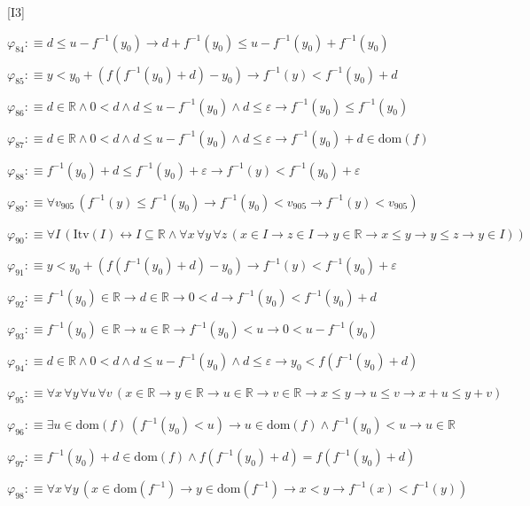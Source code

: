 \begin{fullproof}{[I3]}
\begin{abbrevlist}
\item $\varphi_{84} :\equiv d \leq u - f^{-1}(y_{0}) \to d + f^{-1}(y_{0}) \leq u - f^{-1}(y_{0}) + f^{-1}(y_{0})$
\item $\varphi_{85} :\equiv y < y_{0} + (f(f^{-1}(y_{0}) + d) - y_{0}) \to f^{-1}(y) < f^{-1}(y_{0}) + d$
\item $\varphi_{86} :\equiv d \in \mathbb{R} \land 0 < d \land d \leq u - f^{-1}(y_{0}) \land d \leq \varepsilon \to f^{-1}(y_{0}) \leq f^{-1}(y_{0})$
\item $\varphi_{87} :\equiv d \in \mathbb{R} \land 0 < d \land d \leq u - f^{-1}(y_{0}) \land d \leq \varepsilon \to f^{-1}(y_{0}) + d \in \mathrm{dom}(f)$
\item $\varphi_{88} :\equiv f^{-1}(y_{0}) + d \leq f^{-1}(y_{0}) + \varepsilon \to f^{-1}(y) < f^{-1}(y_{0}) + \varepsilon$
\item $\varphi_{89} :\equiv \forall v_{905}\,(f^{-1}(y) \leq f^{-1}(y_{0}) \to f^{-1}(y_{0}) < v_{905} \to f^{-1}(y) < v_{905})$
\item $\varphi_{90} :\equiv \forall I\,(\mathrm{Itv}(I) \leftrightarrow I \subseteq \mathbb{R} \land \forall x\,\forall y\,\forall z\,(x \in I \to z \in I \to y \in \mathbb{R} \to x \leq y \to y \leq z \to y \in I))$
\item $\varphi_{91} :\equiv y < y_{0} + (f(f^{-1}(y_{0}) + d) - y_{0}) \to f^{-1}(y) < f^{-1}(y_{0}) + \varepsilon$
\item $\varphi_{92} :\equiv f^{-1}(y_{0}) \in \mathbb{R} \to d \in \mathbb{R} \to 0 < d \to f^{-1}(y_{0}) < f^{-1}(y_{0}) + d$
\item $\varphi_{93} :\equiv f^{-1}(y_{0}) \in \mathbb{R} \to u \in \mathbb{R} \to f^{-1}(y_{0}) < u \to 0 < u - f^{-1}(y_{0})$
\item $\varphi_{94} :\equiv d \in \mathbb{R} \land 0 < d \land d \leq u - f^{-1}(y_{0}) \land d \leq \varepsilon \to y_{0} < f(f^{-1}(y_{0}) + d)$
\item $\varphi_{95} :\equiv \forall x\,\forall y\,\forall u\,\forall v\,(x \in \mathbb{R} \to y \in \mathbb{R} \to u \in \mathbb{R} \to v \in \mathbb{R} \to x \leq y \to u \leq v \to x + u \leq y + v)$
\item $\varphi_{96} :\equiv \exists u \in \mathrm{dom}(f)\,(f^{-1}(y_{0}) < u) \to u \in \mathrm{dom}(f) \land f^{-1}(y_{0}) < u \to u \in \mathbb{R}$
\item $\varphi_{97} :\equiv f^{-1}(y_{0}) + d \in \mathrm{dom}(f) \land f(f^{-1}(y_{0}) + d) = f(f^{-1}(y_{0}) + d)$
\item $\varphi_{98} :\equiv \forall x\,\forall y\,(x \in \mathrm{dom}(f^{-1}) \to y \in \mathrm{dom}(f^{-1}) \to x < y \to f^{-1}(x) < f^{-1}(y))$

\end{abbrevlist}
\end{fullproof}
